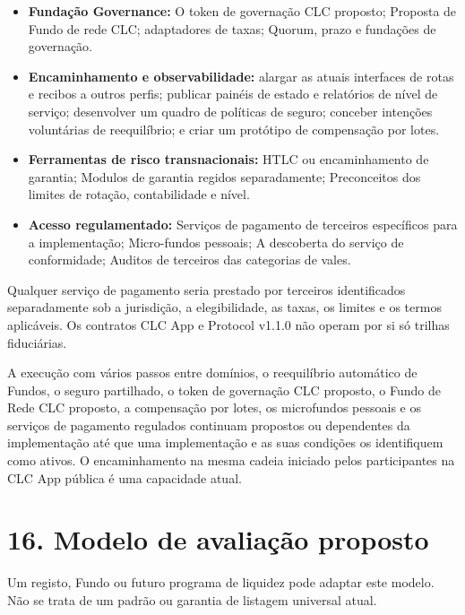 \documentclass[11pt]{article}
\begin{document}
\begin{itemize}[leftmargin=*]
\item \textbf{Fundação Governance:} O token de governação CLC proposto; Proposta de Fundo de rede CLC; adaptadores de taxas; Quorum, prazo e fundações de governação.
\item \textbf{Encaminhamento e observabilidade:} alargar as atuais interfaces de rotas e recibos a outros perfis; publicar painéis de estado e relatórios de nível de serviço; desenvolver um quadro de políticas de seguro; conceber intenções voluntárias de reequilíbrio; e criar um protótipo de compensação por lotes.
\item \textbf{Ferramentas de risco transnacionais:} HTLC ou encaminhamento de garantia; Modulos de garantia regidos separadamente; Preconceitos dos limites de rotação, contabilidade e nível.
\item \textbf{Acesso regulamentado:} Serviços de pagamento de terceiros específicos para a implementação; Micro-fundos pessoais; A descoberta do serviço de conformidade; Auditos de terceiros das categorias de vales.
\end{itemize}
Qualquer serviço de pagamento seria prestado por terceiros identificados separadamente sob a jurisdição, a elegibilidade, as taxas, os limites e os termos aplicáveis. Os contratos CLC App e Protocol v1.1.0 não operam por si só trilhas fiduciárias.

A execução com vários passos entre domínios, o reequilíbrio automático de Fundos, o seguro partilhado, o token de governação CLC proposto, o Fundo de Rede CLC proposto, a compensação por lotes, os microfundos pessoais e os serviços de pagamento regulados continuam propostos ou dependentes da implementação até que uma implementação e as suas condições os identifiquem como ativos. O encaminhamento na mesma cadeia iniciado pelos participantes na CLC App pública é uma capacidade atual.


\section*{16. Modelo de avaliação proposto}

Um registo, Fundo ou futuro programa de liquidez pode adaptar este modelo. Não se trata de um padrão ou garantia de listagem universal atual.
\end{document}
